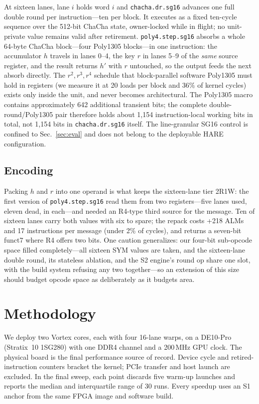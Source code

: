 \documentclass[conference]{IEEEtran}
\begin{document}
At sixteen lanes, lane $i$ holds word $i$ and \texttt{chacha.dr.sg16}
advances one full double round per instruction---ten per block. It executes
as a fixed ten-cycle sequence over the 512-bit ChaCha state, owner-locked
while in flight; no unit-private value remains valid after retirement.
\texttt{poly4.step.sg16} absorbs a whole 64-byte ChaCha block---four
Poly1305 blocks---in one instruction: the accumulator $h$ travels in lanes
0--4, the key $r$ in lanes 5--9 of the \emph{same} source register, and the
result returns $h'$ with $r$ untouched, so the output feeds the next absorb
directly. The $r^2,r^3,r^4$ schedule that block-parallel software Poly1305
must hold in registers (we measure it at 20 loads per block and 36\% of
kernel cycles) exists only inside the unit, and never becomes architectural.
The Poly1305 macro contains approximately 642 additional transient bits; the
complete double-round/Poly1305 pair therefore holds about 1{,}154
instruction-local working bits in total, not 1{,}154 bits in
\texttt{chacha.dr.sg16} itself.
The line-granular SG16 control is confined to Sec.~\ref{sec:eval} and does not
belong to the deployable HARE configuration.

\subsection{Encoding}
Packing $h$ and $r$ into one operand is what keeps the sixteen-lane tier
2R1W: the first version of \texttt{poly4.step.sg16} read them from two
registers---five lanes used, eleven dead, in each---and needed an R4-type
third source for the message. Ten of sixteen lanes carry both values with
six to spare; the repack costs +218 ALMs and 17 instructions per message
(under 2\% of cycles), and returns a seven-bit funct7 where R4 offers two
bits. One caution generalizes: our four-bit sub-opcode space filled
completely---all sixteen SYM values are taken, and the sixteen-lane double
round, its stateless ablation, and the S2 engine's round op share one slot,
with the build system refusing any two together---so an extension of this
size should budget opcode space as deliberately as it budgets area.

\section{Methodology}\label{sec:method}

We deploy two Vortex cores, each with four 16-lane warps, on a DE10-Pro
(Stratix~10 1SG280) with one DDR4 channel and a 200\,MHz GPU clock. The
physical board is the final performance source of record. Device cycle and
retired-instruction counters bracket the kernel; PCIe transfer and host launch
are excluded. In the final sweep, each point discards five warm-up launches
and reports the median and interquartile range of 30 runs. Every speedup uses
an S1 anchor from the same FPGA image and software build.
\end{document}
